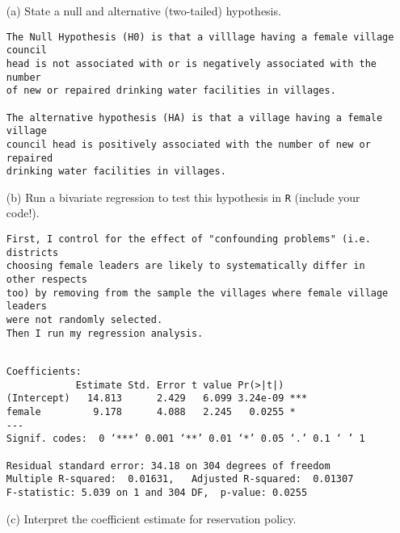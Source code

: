\documentclass[12pt,letterpaper]{article}
\begin{document}
\begin{enumerate}
	\item [(a)] State a null and alternative (two-tailed) hypothesis. 
\begin{verbatim}
The Null Hypothesis (H0) is that a villlage having a female village council
head is not associated with or is negatively associated with the number
of new or repaired drinking water facilities in villages.

The alternative hypothesis (HA) is that a village having a female village
council head is positively associated with the number of new or repaired
drinking water facilities in villages.
\end{verbatim}	

	\item [(b)] Run a bivariate regression to test this hypothesis in \texttt{R} (include your code!).
\begin{verbatim}
First, I control for the effect of "confounding problems" (i.e. districts
choosing female leaders are likely to systematically differ in other respects
too) by removing from the sample the villages where female village leaders
were not randomly selected.
Then I run my regression analysis.
\end{verbatim}	

\begin{verbatim}

Coefficients:
            Estimate Std. Error t value Pr(>|t|)    
(Intercept)   14.813      2.429   6.099 3.24e-09 ***
female         9.178      4.088   2.245   0.0255 *  
---
Signif. codes:  0 ‘***’ 0.001 ‘**’ 0.01 ‘*’ 0.05 ‘.’ 0.1 ‘ ’ 1

Residual standard error: 34.18 on 304 degrees of freedom
Multiple R-squared:  0.01631,	Adjusted R-squared:  0.01307 
F-statistic: 5.039 on 1 and 304 DF,  p-value: 0.0255
\end{verbatim}	
	\item [(c)] Interpret the coefficient estimate for reservation policy.
\begin{verbatim}


\end{verbatim}
\end{enumerate}
\end{document}

